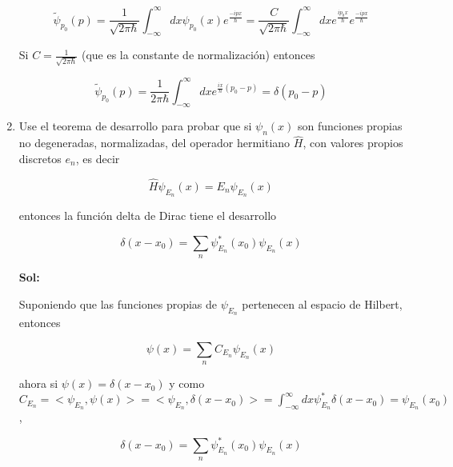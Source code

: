\documentclass[12pt,a4paper]{article}
\begin{document}
\begin{enumerate}
    \begin{equation*}
        \tilde{\psi}_{p_0}(p) =\frac{1}{\sqrt{2 \pi \hbar}} \int_{-\infty}^{\infty} dx \psi_{p_0}(x) e^{\frac{-ipx}{\hbar}}=\frac{C}{\sqrt{2 \pi \hbar}} \int_{-\infty}^{\infty} dx e^{\frac{ip_0x}{\hbar}} e^{\frac{-ipx}{\hbar}}
    \end{equation*}
    
    Si $C= \frac{1}{\sqrt{2 \pi \hbar}}$ (que es la constante de normalización) entonces
    
    \begin{equation*}
        \tilde{\psi}_{p_0}(p) = \frac{1}{2 \pi \hbar} \int_{-\infty}^{\infty} dx e^{\frac{ix}{\hbar}(p_0 - p)} = \delta(p_0 - p)
    \end{equation*}
    
    
    
    
    \item Use el teorema de desarrollo para probar que si $\psi_{n}(x)$ son funciones propias no degeneradas, normalizadas, del operador hermitiano $\hat{H}$, con valores propios discretos $e_n$, es decir
    
    \begin{equation*}
        \hat{H}\psi_{E_n}(x)=E_n \psi_{E_n}(x)
    \end{equation*}
    
    entonces la función delta de Dirac tiene el desarrollo
    
    \begin{equation*}
        \delta(x-x_0) = \sum_{n} \psi_{E_n}^{*}(x_0) \psi_{E_n}(x)
    \end{equation*}
    
    \textbf{Sol:}
    
    Suponiendo que las funciones propias de $\psi_{E_n}$ pertenecen al espacio de Hilbert, entonces
    
    \begin{equation*}
        \psi (x) = \sum_n C_{E_n} \psi_{E_n} (x)
    \end{equation*}
    
    ahora si $\psi(x) = \delta (x - x_0)$ y como $C_{E_n}= <\psi_{E_n}, \psi(x)> = <\psi_{E_n}, \delta (x- x_0)> = \int_{-\infty}^{\infty} dx \psi_{E_n}^{*} \delta (x-x_0) = \psi_{E_n} (x_0)$,
    
    \begin{equation*}
        \delta(x-x_0) = \sum_{n} \psi_{E_n}^{*}(x_0) \psi_{E_n}(x)
    \end{equation*}
    

\end{enumerate}
\end{document}
